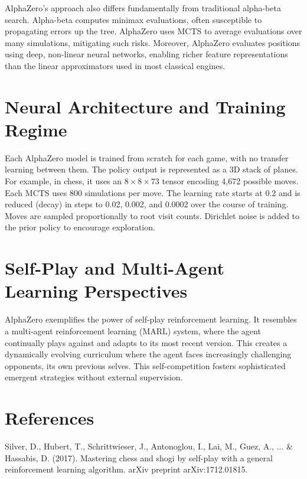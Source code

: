 \documentclass[12pt]{article}
\begin{document}
\noindent AlphaZero’s approach also differs fundamentally from traditional alpha-beta search. Alpha-beta computes minimax evaluations, often susceptible to propagating errors up the tree. AlphaZero uses MCTS to average evaluations over many simulations, mitigating such risks. Moreover, AlphaZero evaluates positions using deep, non-linear neural networks, enabling richer feature representations than the linear approximators used in most classical engines.

\section*{Neural Architecture and Training Regime}

Each AlphaZero model is trained from scratch for each game, with no transfer learning between them. The policy output is represented as a 3D stack of planes. For example, in chess, it uses an $8 \times 8 \times 73$ tensor encoding 4,672 possible moves. Each MCTS uses 800 simulations per move. The learning rate starts at 0.2 and is reduced (decay) in steps to 0.02, 0.002, and 0.0002 over the course of training. Moves are sampled proportionally to root visit counts. Dirichlet noise is added to the prior policy to encourage exploration.

\section*{Self-Play and Multi-Agent Learning Perspectives}

AlphaZero exemplifies the power of self-play reinforcement learning. It resembles a multi-agent reinforcement learning (MARL) system, where the agent continually plays against and adapts to its most recent version. This creates a dynamically evolving curriculum where the agent faces increasingly challenging opponents, its own previous selves. This self-competition fosters sophisticated emergent strategies without external supervision.

\section*{References}

Silver, D., Hubert, T., Schrittwieser, J., Antonoglou, I., Lai, M., Guez, A., ... & Hassabis, D. (2017). Mastering chess and shogi by self-play with a general reinforcement learning algorithm. arXiv preprint arXiv:1712.01815.
\end{document}
